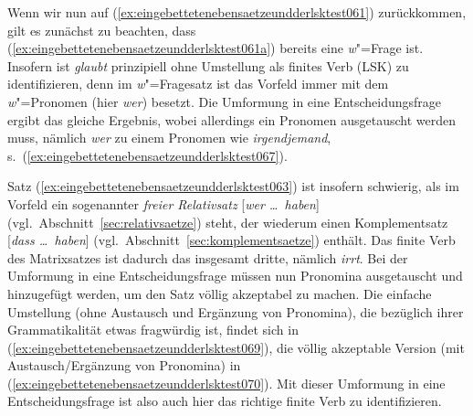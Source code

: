 \begin{exe}
\end{exe}

Wenn wir nun auf (\ref{ex:eingebettetenebensaetzeundderlsktest061}) zurückkommen, gilt es zunächst zu beachten, dass (\ref{ex:eingebettetenebensaetzeundderlsktest061a}) bereits eine \textit{w}"=Frage ist.
Insofern ist \textit{glaubt} prinzipiell ohne Umstellung als finites Verb (LSK) zu identifizieren, denn im \textit{w}"=Fragesatz ist das Vorfeld immer mit dem \textit{w}"=Pro\-no\-men (hier \textit{wer}) besetzt.
Die Umformung in eine Entscheidungsfrage ergibt das gleiche Ergebnis, wobei allerdings ein Pronomen ausgetauscht werden muss, nämlich \textit{wer} zu einem Pronomen wie \textit{irgendjemand}, s.\ (\ref{ex:eingebettetenebensaetzeundderlsktest067}).

\begin{exe}
\end{exe}

Satz (\ref{ex:eingebettetenebensaetzeundderlsktest063}) ist insofern schwierig, als im Vorfeld ein sogenannter \textit{freier Relativsatz} [\textit{wer \ldots\ haben}] (vgl.\ Abschnitt~\ref{sec:relativsaetze}) steht, der wiederum einen Komplementsatz [\textit{dass \ldots\ haben}] (vgl.\ Abschnitt~\ref{sec:komplementsaetze}) enthält.
Das finite Verb des Matrixsatzes ist dadurch das insgesamt dritte, nämlich \textit{irrt}.
Bei der Umformung in eine Entscheidungsfrage müssen nun Pronomina ausgetauscht und hinzugefügt werden, um den Satz völlig akzeptabel zu machen.
Die einfache Umstellung (ohne Austausch und Ergänzung von Pronomina), die bezüglich ihrer Grammatikalität etwas fragwürdig ist, findet sich in (\ref{ex:eingebettetenebensaetzeundderlsktest069}), die völlig akzeptable Version (mit Austausch\slash Ergänzung von Pronomina) in (\ref{ex:eingebettetenebensaetzeundderlsktest070}).
Mit dieser Umformung in eine Entscheidungsfrage ist also auch hier das richtige finite Verb zu identifizieren.

\begin{exe}
  \ex\label{ex:eingebettetenebensaetzeundderlsktest068}
  \begin{xlist}
  \end{xlist}
\end{exe}

